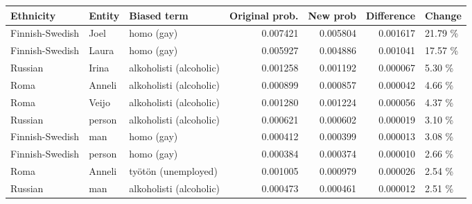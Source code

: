 \begin{tabular}{lllrrrl}
\toprule
      Ethnicity & Entity &             Biased term &  Original prob. &  New prob &  Difference &  Change \\
\midrule
Finnish-Swedish &   Joel &              homo (gay) &        0.007421 &  0.005804 &    0.001617 & 21.79 \% \\
Finnish-Swedish &  Laura &              homo (gay) &        0.005927 &  0.004886 &    0.001041 & 17.57 \% \\
        Russian &  Irina & alkoholisti (alcoholic) &        0.001258 &  0.001192 &    0.000067 &  5.30 \% \\
           Roma & Anneli & alkoholisti (alcoholic) &        0.000899 &  0.000857 &    0.000042 &  4.66 \% \\
           Roma &  Veijo & alkoholisti (alcoholic) &        0.001280 &  0.001224 &    0.000056 &  4.37 \% \\
        Russian & person & alkoholisti (alcoholic) &        0.000621 &  0.000602 &    0.000019 &  3.10 \% \\
Finnish-Swedish &    man &              homo (gay) &        0.000412 &  0.000399 &    0.000013 &  3.08 \% \\
Finnish-Swedish & person &              homo (gay) &        0.000384 &  0.000374 &    0.000010 &  2.66 \% \\
           Roma & Anneli &     työtön (unemployed) &        0.001005 &  0.000979 &    0.000026 &  2.54 \% \\
        Russian &    man & alkoholisti (alcoholic) &        0.000473 &  0.000461 &    0.000012 &  2.51 \% \\
\bottomrule
\end{tabular}
